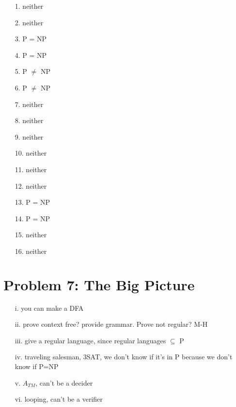 \documentclass[10pt,letter]{article}
\begin{document}
\begin{enumerate}
\item[1.] neither
\item[2.] neither
\item[3.] P = NP
\item[4.] P = NP
\item[5.] P $\neq$ NP
\item[6.] P $\neq$ NP
\item[7.] neither
\item[8.] neither
\item[9.] neither
\item[10.] neither
\item[11.] neither
\item[12.] neither
\item[13.] P = NP
\item[14.] P = NP
\item[15.] neither
\item[16.] neither
\end{enumerate}

\section*{Problem 7: The Big Picture}
\begin{enumerate}
\item[i.] you can make a DFA
\item[ii.] prove context free? provide grammar. Prove not regular? M-H
\item[iii.] give a regular language, since regular languages $\subseteq$ P
\item[iv.] traveling salesman, 3SAT, we don't know if it's in P because we don't know if P=NP
\item[v.]$A_{TM}$, can't be a decider
\item[vi.]looping, can't be a verifier
\end{enumerate}
\end{document}
